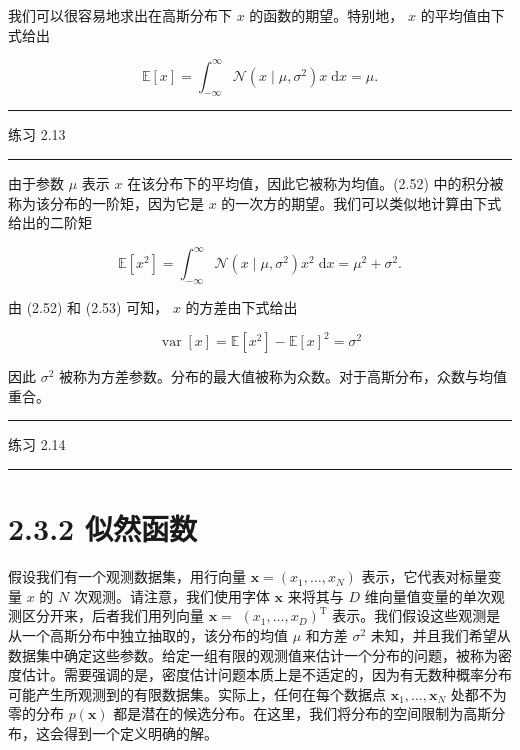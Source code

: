 \documentclass[10pt]{article}
\newcommand{\HRule}{\begin{center}\rule{0.9\linewidth}{0.2mm}\end{center}}
\begin{document}
我们可以很容易地求出在高斯分布下 \(x\) 的函数的期望。特别地， \(x\) 的平均值由下式给出

\[
\mathbb{E}\left\lbrack  x\right\rbrack   = {\int }_{-\infty }^{\infty }\mathcal{N}\left( {x \mid  \mu ,{\sigma }^{2}}\right) x\mathrm{\;d}x = \mu . \tag{2.52}
\]

\HRule

练习 2.13

\HRule

由于参数 \(\mu\) 表示 \(x\) 在该分布下的平均值，因此它被称为均值。(2.52) 中的积分被称为该分布的一阶矩，因为它是 \(x\) 的一次方的期望。我们可以类似地计算由下式给出的二阶矩

\[
\mathbb{E}\left\lbrack  {x}^{2}\right\rbrack   = {\int }_{-\infty }^{\infty }\mathcal{N}\left( {x \mid  \mu ,{\sigma }^{2}}\right) {x}^{2}\mathrm{\;d}x = {\mu }^{2} + {\sigma }^{2}. \tag{2.53}
\]

由 (2.52) 和 (2.53) 可知， \(x\) 的方差由下式给出

\[
\operatorname{var}\left\lbrack  x\right\rbrack   = \mathbb{E}\left\lbrack  {x}^{2}\right\rbrack   - \mathbb{E}{\left\lbrack  x\right\rbrack  }^{2} = {\sigma }^{2} \tag{2.54}
\]

因此 \({\sigma }^{2}\) 被称为方差参数。分布的最大值被称为众数。对于高斯分布，众数与均值重合。

\HRule

练习 2.14

\HRule

\section*{2.3.2 似然函数}

假设我们有一个观测数据集，用行向量 \(\mathbf{x} = \left( {{x}_{1},\ldots ,{x}_{N}}\right)\) 表示，它代表对标量变量 \(x\) 的 \(N\) 次观测。请注意，我们使用字体 \(\mathbf{x}\) 来将其与 \(D\) 维向量值变量的单次观测区分开来，后者我们用列向量 \(\mathbf{x} =\)  \({\left( {x}_{1},\ldots ,{x}_{D}\right) }^{\mathrm{T}}\) 表示。我们假设这些观测是从一个高斯分布中独立抽取的，该分布的均值 \(\mu\) 和方差 \({\sigma }^{2}\) 未知，并且我们希望从数据集中确定这些参数。给定一组有限的观测值来估计一个分布的问题，被称为密度估计。需要强调的是，密度估计问题本质上是不适定的，因为有无数种概率分布可能产生所观测到的有限数据集。实际上，任何在每个数据点 \({\mathbf{x}}_{1},\ldots ,{\mathbf{x}}_{N}\) 处都不为零的分布 \(p\left( \mathbf{x}\right)\) 都是潜在的候选分布。在这里，我们将分布的空间限制为高斯分布，这会得到一个定义明确的解。
\end{document}
